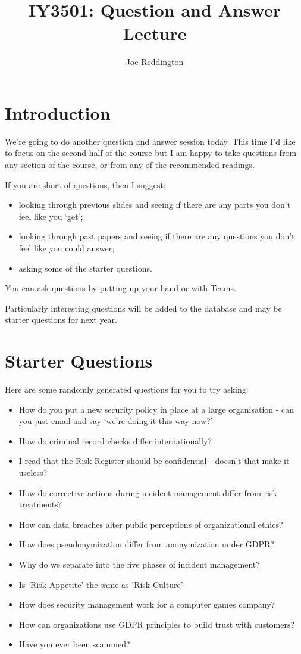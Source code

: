 \documentclass[12pt]{article}
\title{IY3501: Question and Answer Lecture}
\author{Joe Reddington}
\date{}
\begin{document}
\maketitle

\section*{Introduction}
We're going to do another question and answer session today. This time I'd like to focus on the second half of the course but I am happy to take questions from any section of the course, or from any of the recommended readings. 

If you are short of questions, then I suggest: 

\begin{itemize} 
\item looking through previous slides and seeing if there are any parts you don't feel like you `get';
\item looking through past papers and seeing if there are any questions you don't feel like you could answer;
\item asking some of the starter questions.
\end{itemize} 

You can ask questions by putting up your hand or with Teams.  

Particularly interesting questions will be added to the database and may be starter questions for next year.  

\section*{Starter Questions} 
Here are some randomly generated questions for you to try asking: 

\begin{itemize}
  \item How do you put a new security policy in place at a large organisation - can you just email and say `we're doing it this way now?'
  \item How do criminal record checks differ internationally?
  \item I read that the Risk Register should be confidential - doesn't that make it useless?
  \item How do corrective actions during incident management differ from risk treatments?
  \item How can data breaches alter public perceptions of organizational ethics?
  \item How does pseudonymization differ from anonymization under GDPR?
  \item Why do we separate into the five phases of incident management?
  \item Is `Risk Appetite' the same as 'Risk Culture'
  \item How does security management work for a computer games company?
  \item How can organizations use GDPR principles to build trust with customers?
  \item Have you ever been scammed?
\end{itemize}
\end{document}
